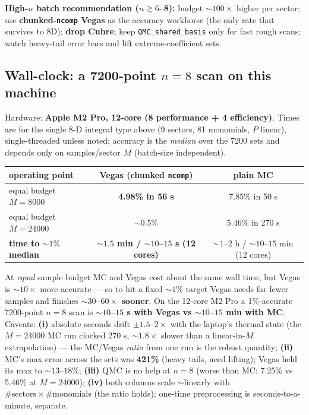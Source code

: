 \documentclass[11pt,a4paper]{article}
\newcommand{\best}[1]{\textbf{#1}}
\begin{document}
\textbf{High-$n$ batch recommendation ($n\gtrsim6$--8):} budget ${\sim}100\times$
higher per sector; use \textbf{chunked-\texttt{ncomp} Vegas} as the accuracy
workhorse (the only rate that survives to 8D); \textbf{drop Cuhre}; keep
\texttt{QMC\_shared\_basis} only for fast rough scans; watch heavy-tail error
bars and lift extreme-coefficient sets.

\subsection{Wall-clock: a 7200-point $n=8$ scan on this machine}
Hardware: \textbf{Apple M2 Pro, 12-core (8 performance + 4 efficiency)}. Times
are for the single 8-D integral type above (9 sectors, 81 monomials, $P$
linear), single-threaded unless noted; accuracy is the \emph{median} over the
7200 sets and depends only on samples/sector $M$ (batch-size independent).

\begin{center}\small
\begin{tabular}{@{}lcc@{}}
\toprule
operating point & Vegas (chunked \texttt{ncomp}) & plain MC \\
\midrule
equal budget $M{=}8000$  & \best{4.98\% in 56 s} & 7.85\% in 50 s \\
equal budget $M{=}24000$ & ${\sim}0.5\%$ & 5.46\% in 270 s \\
\textbf{time to ${\sim}1\%$ median} & \best{${\sim}1.5$ min / ${\sim}10$--$15$ s (12 cores)} & ${\sim}1$--$2$ h / ${\sim}10$--$15$ min (12 cores) \\
\bottomrule
\end{tabular}
\end{center}

\noindent At \emph{equal} sample budget MC and Vegas cost about the same wall
time, but Vegas is ${\sim}10\times$ more accurate --- so to hit a fixed
${\sim}1\%$ target Vegas needs far fewer samples and finishes
\textbf{${\sim}30$--$60\times$ sooner}. On the 12-core M2 Pro a 1\%-accurate
7200-point $n{=}8$ scan is \textbf{${\sim}10$--$15$ s with Vegas vs
${\sim}10$--$15$ min with MC}. Caveats: \textbf{(i)} absolute seconds drift
$\pm1.5$--$2\times$ with the laptop's thermal state (the $M{=}24000$ MC run
clocked 270 s, ${\sim}1.8\times$ slower than a linear-in-$M$ extrapolation) --- the
MC/Vegas \emph{ratio} from one run is the robust quantity; \textbf{(ii)} MC's max
error across the sets was \textbf{421\%} (heavy tails, need lifting); Vegas held
its max to ${\sim}13$--$18\%$; \textbf{(iii)} QMC is no help at $n{=}8$ (worse than
MC: 7.25\% vs 5.46\% at $M{=}24000$); \textbf{(iv)} both columns scale
${\sim}$linearly with $\#\text{sectors}\times\#\text{monomials}$ (the ratio holds);
one-time preprocessing is seconds-to-a-minute, separate.
\end{document}
